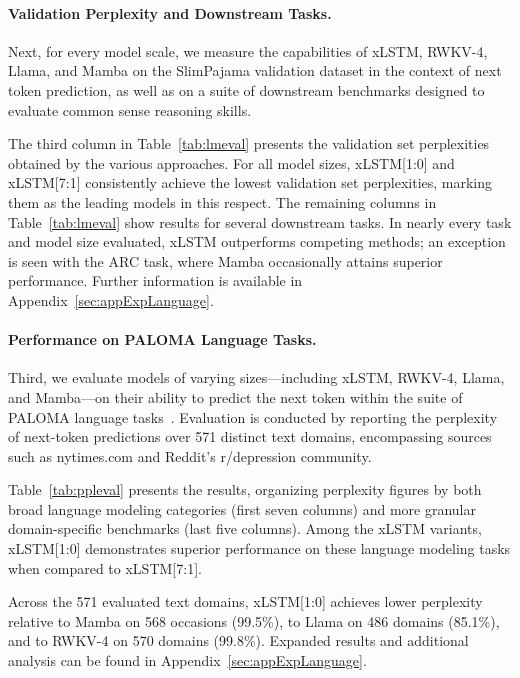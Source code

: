 \paragraph{Validation Perplexity and Downstream Tasks.}
\label{sec:spaj_downstream_eval}
Next, for every model scale, we measure the capabilities of xLSTM, RWKV-4, Llama, and Mamba on the SlimPajama validation dataset in the context of next token prediction, as well as on a suite of downstream benchmarks designed to evaluate common sense reasoning skills.

The third column in Table~\ref{tab:lmeval} presents the validation set perplexities obtained by the various approaches. For all model sizes, xLSTM[1:0] and xLSTM[7:1] consistently achieve the lowest validation set perplexities, marking them as the leading models in this respect. The remaining columns in Table~\ref{tab:lmeval} show results for several downstream tasks. In nearly every task and model size evaluated, xLSTM outperforms competing methods; an exception is seen with the ARC task, where Mamba occasionally attains superior performance. Further information is available in Appendix~\ref{sec:appExpLanguage}.

\paragraph{Performance on PALOMA Language Tasks.} Third, we evaluate models of varying sizes—including xLSTM, RWKV-4, Llama, and Mamba—on their ability to predict the next token within the suite of PALOMA language tasks~\citep{Magnusson:23arxivshort}. Evaluation is conducted by reporting the perplexity of next-token predictions over 571 distinct text domains, encompassing sources such as nytimes.com and Reddit's r/depression community.

Table~\ref{tab:ppleval} presents the results, organizing perplexity figures by both broad language modeling categories (first seven columns) and more granular domain-specific benchmarks (last five columns). Among the xLSTM variants, xLSTM[1:0] demonstrates superior performance on these language modeling tasks when compared to xLSTM[7:1].

Across the 571 evaluated text domains, xLSTM[1:0] achieves lower perplexity relative to Mamba on 568 occasions (99.5\%), to Llama on 486 domains (85.1\%), and to RWKV-4 on 570 domains (99.8\%). Expanded results and additional analysis can be found in Appendix~\ref{sec:appExpLanguage}.


